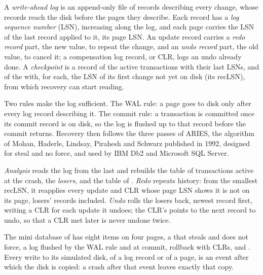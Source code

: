 \begin{definition}\label{def:b3:transactions-and-recovery:wal}
A \emph{write-ahead log} is an append-only file of records describing every change, whose records reach the disk before the pages they describe. Each record has a \emph{log sequence number} (LSN), increasing along the log, and each page carries the LSN of the last record applied to it, its page LSN. An update record carries a \emph{redo record} part, the new value, to repeat the change, and an \emph{undo record} part, the old value, to cancel it; a compensation log record, or CLR, logs an undo already done. A \emph{checkpoint} is a record of the active transactions with their last LSNs, and of the  with, for each, the LSN of its first change not yet on disk (its recLSN), from which recovery can start reading.
\end{definition}

Two rules make the log sufficient. The WAL rule: a page goes to disk only after every log record describing it. The commit rule: a transaction is committed once its commit record is on disk, so the log is flushed up to that record before the commit returns. Recovery then follows the three passes of ARIES, the algorithm of Mohan, Haderle, Lindsay, Pirahesh and Schwarz published in 1992, designed for steal and no force, and used by IBM Db2 and Microsoft SQL Server. %

\begin{definition}\label{def:b3:transactions-and-recovery:aries}
\emph{Analysis} reads the log from the last  and rebuilds the table of transactions active at the crash, the \emph{losers}, and the table of . \emph{Redo} repeats history: from the smallest recLSN, it reapplies every update and CLR whose page LSN shows it is not on its page, losers' records included. \emph{Undo} rolls the losers back, newest record first, writing a CLR for each update it undoes; the CLR's  points to the next record to undo, so that a CLR met later is never undone twice.
\end{definition}

The mini database of  has eight items on four pages, a  that steals and does not force, a log flushed by the WAL rule and at commit, rollback with CLRs, and . Every write to its simulated disk, of a log record or of a page, is an event after which the disk is copied: a crash after that event leaves exactly that copy.

